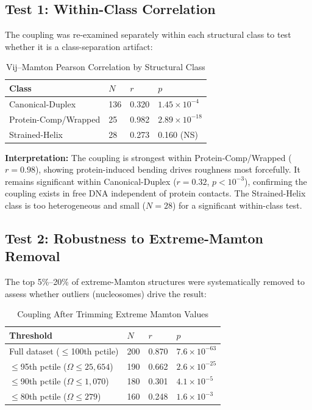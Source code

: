 \subsection{Test 1: Within-Class Correlation}

The coupling was re-examined separately within each structural class to test whether it is a class-separation artifact:

\begin{table}[h]
    \centering
    \caption{Vij--Mamton Pearson Correlation by Structural Class}
    \begin{tabular}{llll}
        \toprule
        \textbf{Class} & $N$ & $r$ & $p$ \\
        \midrule
        Canonical-Duplex       & 136 & 0.320 & $1.45 \times 10^{-4}$ \\
        Protein-Comp/Wrapped   &  25 & 0.982 & $2.89 \times 10^{-18}$ \\
        Strained-Helix         &  28 & 0.273 & 0.160 (NS) \\
        \bottomrule
    \end{tabular}
\end{table}

\textbf{Interpretation:} The coupling is strongest within Protein-Comp/Wrapped ($r=0.98$), showing protein-induced bending drives roughness most forcefully. It remains significant within Canonical-Duplex ($r=0.32$, $p<10^{-3}$), confirming the coupling exists in free DNA independent of protein contacts. The Strained-Helix class is too heterogeneous and small ($N=28$) for a significant within-class test.

\subsection{Test 2: Robustness to Extreme-Mamton Removal}

The top 5\%--20\% of extreme-Mamton structures were systematically removed to assess whether outliers (nucleosomes) drive the result:

\begin{table}[h]
    \centering
    \caption{Coupling After Trimming Extreme Mamton Values}
    \begin{tabular}{llll}
        \toprule
        \textbf{Threshold} & $N$ & $r$ & $p$ \\
        \midrule
        Full dataset ($\leq$100th pctile) & 200 & 0.870 & $7.6 \times 10^{-63}$ \\
        $\leq$95th pctile ($\Omega \leq 25{,}654$) & 190 & 0.662 & $2.6 \times 10^{-25}$ \\
        $\leq$90th pctile ($\Omega \leq 1{,}070$) & 180 & 0.301 & $4.1 \times 10^{-5}$ \\
        $\leq$80th pctile ($\Omega \leq 279$) & 160 & 0.248 & $1.6 \times 10^{-3}$ \\
        \bottomrule
    \end{tabular}
\end{table}

